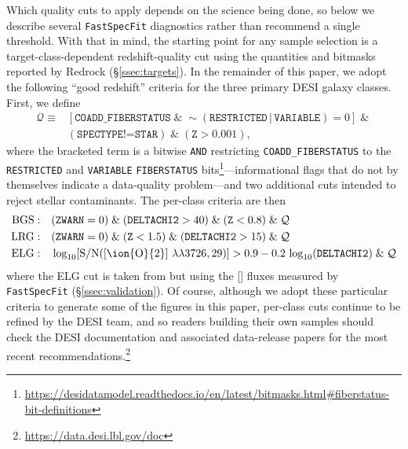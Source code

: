 \documentclass[modern,linenumbers]{aastex701}
\newcommand{\fastspecfit}{\texttt{FastSpecFit}}
\newcommand{\oii}{[\ion{O}{2}]}
\newcommand{\oiidoublet}{[\ion{O}{2}]~$\lambda\lambda3726,29$}
\begin{document}
Which quality cuts to apply depends on the science being done, so
below we describe several \fastspecfit{} diagnostics rather than
recommend a single threshold. With that in mind, the starting point
for any sample selection is a target-class-dependent redshift-quality
cut using the quantities and bitmasks reported by Redrock
(\S\ref{ssec:targets}). In the remainder of this paper, we adopt the
following ``good redshift'' criteria for the three primary DESI galaxy
classes. First, we define
\begin{equation}
  \begin{split}
    \mathcal{Q} \equiv {} & [\mathtt{COADD\_FIBERSTATUS} \;\&\;
    \sim (\mathtt{RESTRICTED} \,|\, \mathtt{VARIABLE}) = 0] \;\&\; \\
    & (\mathtt{SPECTYPE} \texttt{!=} \mathtt{STAR}) \;\&\; (\mathtt{Z} > 0.001),
  \end{split}
  \label{eq:goodz_common}
\end{equation}
\noindent where the bracketed term is a bitwise \texttt{AND}
restricting \texttt{COADD\_FIBERSTATUS} to the \texttt{RESTRICTED} and
\texttt{VARIABLE} \texttt{FIBERSTATUS}
bits\footnote{\url{https://desidatamodel.readthedocs.io/en/latest/bitmasks.html\#fiberstatus-bit-definitions}}---informational
flags that do not by themselves indicate a data-quality problem---and
two additional cuts intended to reject stellar contaminants. The
per-class criteria are then
\begin{align}
  \mathrm{BGS:}\quad & (\mathtt{ZWARN}=0) \;\&\; (\mathtt{DELTACHI2} > 40) \;\&\;
  (\mathtt{Z} < 0.8) \;\&\; \mathcal{Q} \label{eq:goodz_bgs}\\
  \mathrm{LRG:}\quad & (\mathtt{ZWARN}=0) \;\&\; (\mathtt{Z} < 1.5) \;\&\;
  (\mathtt{DELTACHI2} > 15) \;\&\; \mathcal{Q} \label{eq:goodz_lrg}\\
  \mathrm{ELG:}\quad &
  \log_{10}\!\left[\mathrm{S/N}(\text{\oiidoublet})\right] > 0.9 -
  0.2\,\log_{10}(\mathtt{DELTACHI2}) \;\&\; \mathcal{Q}
  \label{eq:goodz_elg}
\end{align}
\noindent where the ELG cut is taken from \citet{raichoor23a} but
using the \oii{} fluxes measured by \fastspecfit{}
(\S\ref{ssec:validation}). Of course, although we adopt these
particular criteria to generate some of the figures in this paper,
per-class cuts continue to be refined by the DESI team, and so readers
building their own samples should check the DESI documentation and
associated data-release papers for the most recent
recommendations.\footnote{\url{https://data.desi.lbl.gov/doc}}
\end{document}
